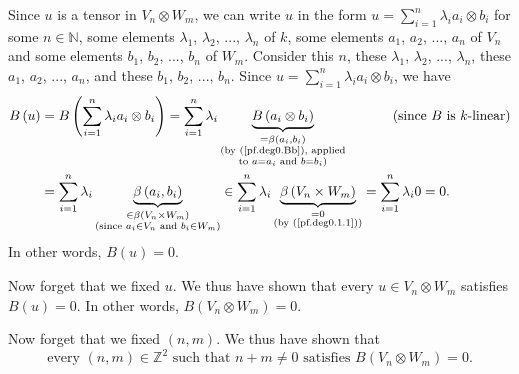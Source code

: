 \documentclass[etingof-lie.tex]{subfiles}
\begin{document}
\begin{verlong}
Since $u$ is a tensor in $V_{n}\otimes W_{m}$, we can write $u$ in the form
$u=\sum\limits_{i=1}^{n}\lambda_{i}a_{i}\otimes b_{i}$ for some $n\in
\mathbb{N}$, some elements $\lambda_{1}$, $\lambda_{2}$, $...$, $\lambda_{n}$
of $k$, some elements $a_{1}$, $a_{2}$, $...$, $a_{n}$ of $V_{n}$ and some
elements $b_{1}$, $b_{2}$, $...$, $b_{n}$ of $W_{m}$. Consider this $n$, these
$\lambda_{1}$, $\lambda_{2}$, $...$, $\lambda_{n}$, these $a_{1}$, $a_{2}$,
$...$, $a_{n}$, and these $b_{1}$, $b_{2}$, $...$, $b_{n}$. Since
$u=\sum\limits_{i=1}^{n}\lambda_{i}a_{i}\otimes b_{i}$, we have%
\begin{align*}
B\left(  u\right)   &  =B\left(  \sum\limits_{i=1}^{n}\lambda_{i}a_{i}\otimes
b_{i}\right)  =\sum\limits_{i=1}^{n}\lambda_{i}\underbrace{B\left(
a_{i}\otimes b_{i}\right)  }_{\substack{=\beta\left(  a_{i},b_{i}\right)
\\\text{(by (\ref{pf.deg0.Bb}), applied}\\\text{to }a=a_{i}\text{ and }%
b=b_{i}\text{)}}}\ \ \ \ \ \ \ \ \ \ \left(  \text{since }B\text{ is
}k\text{-linear}\right) \\
&  =\sum\limits_{i=1}^{n}\lambda_{i}\underbrace{\beta\left(  a_{i}%
,b_{i}\right)  }_{\substack{\in\beta\left(  V_{n}\times W_{m}\right)
\\\text{(since }a_{i}\in V_{n}\text{ and }b_{i}\in W_{m}\text{)}}}\in
\sum\limits_{i=1}^{n}\lambda_{i}\underbrace{\beta\left(  V_{n}\times
W_{m}\right)  }_{\substack{=0\\\text{(by (\ref{pf.deg0.1.1}))}}}=\sum
\limits_{i=1}^{n}\lambda_{i}0=0.
\end{align*}
In other words, $B\left(  u\right)  =0$.

Now forget that we fixed $u$. We thus have shown that every $u\in V_{n}\otimes
W_{m}$ satisfies $B\left(  u\right)  =0$. In other words, $B\left(
V_{n}\otimes W_{m}\right)  =0$.

Now forget that we fixed $\left(  n,m\right)  $. We thus have shown that
\begin{equation}
\text{every }\left(  n,m\right)  \in\mathbb{Z}^{2}\text{ such that }%
n+m\neq0\text{ satisfies }B\left(  V_{n}\otimes W_{m}\right)  =0\text{.}
\label{pf.deg0.1.3}%
\end{equation}



\end{verlong}
\end{document}
